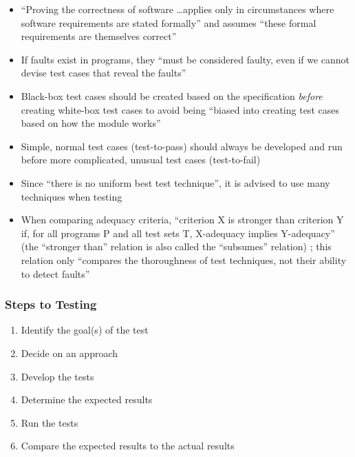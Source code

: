 \begin{itemize}
      \item ``Proving the correctness of software \dots applies only in
            circumstances where software requirements are stated formally'' and
            assumes ``these formal requirements are themselves correct''
            \citep[p.~398]{vanVliet2000}
      \item If faults exist in programs, they ``must be considered faulty, even
            if we cannot devise test cases that reveal the faults''
            \citep[p.~401]{vanVliet2000}
      \item Black-box test cases should be created based on the specification
            \emph{before} creating white-box test cases to avoid being ``biased
            into creating test cases based on how the module works''
            \citep[p.~113]{Patton2006}
      \item Simple, normal test cases (test-to-pass) should always be developed
            and run before more complicated, unusual test cases (test-to-fail)
            \citep[p.~66]{Patton2006}
      \item Since ``there is no uniform best test technique'', it is advised to
            use many techniques when testing \citep[p.~440]{vanVliet2000}
      \item When comparing adequacy criteria, ``criterion X is stronger than
            criterion Y if, for all programs P and all test sets T, X-adequacy
            implies Y-adequacy'' (the ``stronger than'' relation is also called
            the ``subsumes'' relation) \citep[p.~432]{vanVliet2000};
            this relation only ``compares the thoroughness of test techniques,
            not their ability to detect faults'' \citep[p.~434]{vanVliet2000}
\end{itemize}

\subsubsection{Steps to Testing \citep[p.~443]{PetersAndPedrycz2000}}
\begin{enumerate}
      \item Identify the goal(s) of the test
      \item Decide on an approach
      \item Develop the tests
      \item Determine the expected results
      \item Run the tests
      \item Compare the expected results to the actual results
\end{enumerate}

